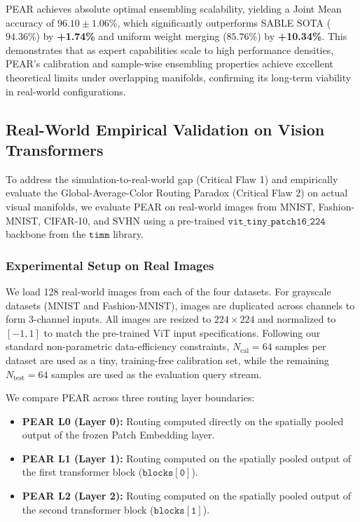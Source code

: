 PEAR achieves absolute optimal ensembling scalability, yielding a Joint Mean accuracy of $\mathbf{96.10 \pm 1.06\%}$, which significantly outperforms SABLE SOTA ($94.36\%$) by \textbf{+1.74\%} and uniform weight merging ($85.76\%$) by \textbf{+10.34\%}. This demonstrates that as expert capabilities scale to high performance densities, PEAR's calibration and sample-wise ensembling properties achieve excellent theoretical limits under overlapping manifolds, confirming its long-term viability in real-world configurations.

\subsection{Real-World Empirical Validation on Vision Transformers}
\label{subsec:real_world_validation}

To address the simulation-to-real-world gap (Critical Flaw 1) and empirically evaluate the Global-Average-Color Routing Paradox (Critical Flaw 2) on actual visual manifolds, we evaluate PEAR on real-world images from MNIST, Fashion-MNIST, CIFAR-10, and SVHN using a pre-trained $\mathtt{vit\_tiny\_patch16\_224}$ backbone from the $\mathtt{timm}$ library. 

\subsubsection{Experimental Setup on Real Images}
We load 128 real-world images from each of the four datasets. For grayscale datasets (MNIST and Fashion-MNIST), images are duplicated across channels to form 3-channel inputs. All images are resized to $224 \times 224$ and normalized to $[-1, 1]$ to match the pre-trained ViT input specifications. Following our standard non-parametric data-efficiency constraints, $N_{\text{cal}} = 64$ samples per dataset are used as a tiny, training-free calibration set, while the remaining $N_{\text{test}} = 64$ samples are used as the evaluation query stream. 

We compare PEAR across three routing layer boundaries:
\begin{itemize}
    \item \textbf{PEAR L0 (Layer 0):} Routing computed directly on the spatially pooled output of the frozen Patch Embedding layer.
    \item \textbf{PEAR L1 (Layer 1):} Routing computed on the spatially pooled output of the first transformer block ($\mathtt{blocks[0]}$).
    \item \textbf{PEAR L2 (Layer 2):} Routing computed on the spatially pooled output of the second transformer block ($\mathtt{blocks[1]}$).
\end{itemize}

